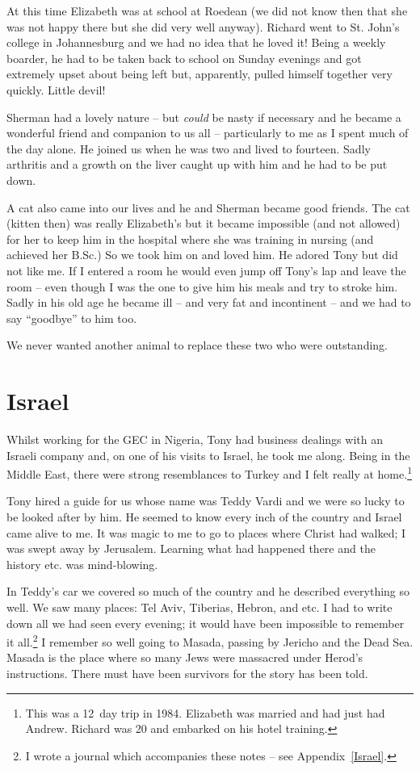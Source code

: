 At this time Elizabeth was at school at Roedean (we did not know then
that she was not happy there but she did very well anyway). Richard
went to St. John's college in Johannesburg and we had no idea that he
loved it! Being a weekly boarder, he had to be taken back to school on
Sunday evenings and got extremely upset about being left but,
apparently, pulled himself together very quickly. Little devil!

Sherman had a lovely nature -- but \textit{could} be nasty if
necessary and he became a wonderful friend and companion to us all --
particularly to me as I spent much of the day alone. He joined us when
he was two and lived to fourteen. Sadly arthritis and a growth on the
liver caught up with him and he had to be put down.

A cat also came into our lives and he and Sherman became good friends.
The cat (kitten then) was really Elizabeth's but it became impossible
(and not allowed) for her to keep him in the hospital where she was
training in nursing (and achieved her B.Sc.) So we took him on and
loved him. He adored Tony but did not like me. If I entered a room he
would even jump off Tony's lap and leave the room -- even though I was
the one to give him his meals and try to stroke him. Sadly in his old
age he became ill -- and very fat and incontinent -- and we had to say
``goodbye'' to him too.

We never wanted another animal to replace these two who were
outstanding.


\chapter{Israel}

Whilst working for the GEC in Nigeria, Tony had business dealings with
an Israeli company and, on one of his visits to Israel, he took me
along. Being in the Middle East, there were strong resemblances to
Turkey and I felt really at home.\footnote{This was a 12~day trip in
  1984. Elizabeth was married and had just had Andrew. Richard was 20
  and embarked on his hotel training.}

Tony hired a guide for us whose name was Teddy Vardi and we were so
lucky to be looked after by him. He seemed to know every inch of the
country and Israel came alive to me. It was magic to me to go to
places where Christ had walked; I was swept away by Jerusalem.
Learning what had happened there and the history etc. was
mind-blowing.

In Teddy's car we covered so much of the country and he described
everything so well. We saw many places: Tel Aviv, Tiberias, Hebron,
and etc. I had to write down all we had seen every evening; it would
have been impossible to remember it all.\footnote{I wrote a journal
  which accompanies these notes -- see Appendix~\ref{Israel}.} I
remember so well going to Masada, passing by Jericho and the Dead
Sea. Masada is the place where so many Jews were massacred under
Herod's instructions. There must have been survivors for the story has
been told.

